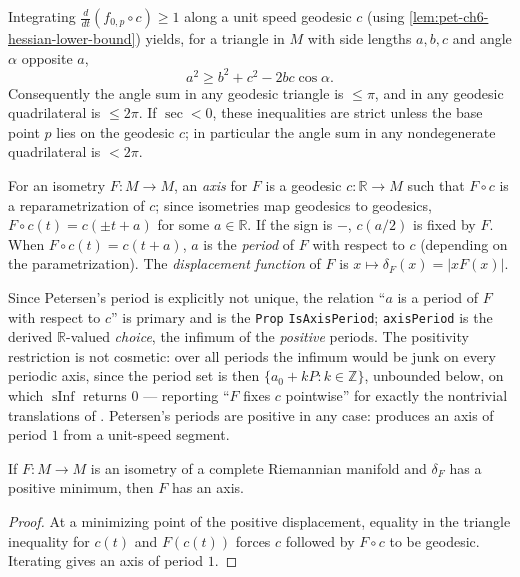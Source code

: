\begin{remark}
  \label{rem:pet-ch6-triangle-comparison}
  Integrating $\frac{d}{dt}(f_{0,p}\circ c)\ge1$ along a unit speed geodesic
  $c$ (using \cref{lem:pet-ch6-hessian-lower-bound}) yields, for a triangle in
  $M$ with side lengths $a,b,c$ and angle $\alpha$ opposite $a$,
  \[
    a^2\ge b^2+c^2-2bc\cos\alpha.
  \]
  Consequently the angle sum in any geodesic triangle is $\le\pi$, and in any
  geodesic quadrilateral is $\le2\pi$. If $\sec<0$, these inequalities are
  strict unless the base point $p$ lies on the geodesic $c$; in particular the
  angle sum in any nondegenerate quadrilateral is $<2\pi$.
\end{remark}

\begin{definition}
  \label{def:pet-ch6-axis-displacement}
  \leanok
  For an isometry $F:M\to M$, an \emph{axis} for $F$ is a geodesic
  $c:\mathbb{R}\to M$ such that $F\circ c$ is a reparametrization of $c$; since
  isometries map geodesics to geodesics, $F\circ c(t)=c(\pm t+a)$ for some
  $a\in\mathbb{R}$. If the sign is $-$, $c(a/2)$ is fixed by $F$. When
  $F\circ c(t)=c(t+a)$, $a$ is the \emph{period} of $F$ with respect to $c$
  (depending on the parametrization). The \emph{displacement function} of $F$
  is $x\mapsto\delta_F(x)=|xF(x)|$.

  Since Petersen's period is explicitly not unique, the relation
  ``$a$ is a period of $F$ with respect to $c$'' is primary and is the
  \texttt{Prop} \texttt{IsAxisPeriod}; \texttt{axisPeriod} is the
  derived $\mathbb{R}$-valued \emph{choice}, the infimum of the
  \emph{positive} periods. The positivity restriction is not cosmetic: over all
  periods the infimum would be junk on every periodic axis, since the period
  set is then $\{a_0+kP:k\in\mathbb{Z}\}$, unbounded below, on which
  $\operatorname{sInf}$ returns $0$ --- reporting ``$F$ fixes $c$ pointwise''
  for exactly the nontrivial translations of .
  Petersen's periods are positive in any case: 
  produces an axis of period $1$ from a unit-speed segment.
\end{definition}

\begin{lemma}
  \label{lem:pet-ch6-axis-existence}
  If $F:M\to M$ is an isometry of a complete Riemannian manifold and
  $\delta_F$ has a positive minimum, then $F$ has an axis.
\end{lemma}
\begin{proof}
  \sketch
  At a minimizing point of the positive displacement, equality in the triangle inequality for \(c(t)\) and \(F(c(t))\) forces \(c\) followed by \(F\circ c\) to be geodesic. Iterating gives an axis of period \(1\).
\end{proof}

